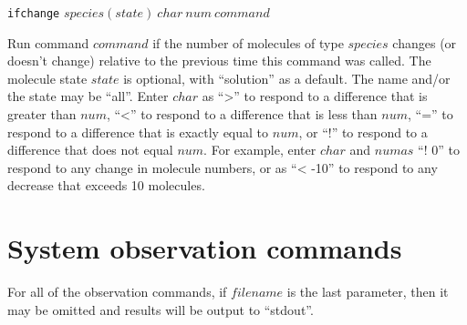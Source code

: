 \documentclass {scrbook}
\newcommand {\ttt} {\texttt}
\begin{document}
\begin{description}
\item{\ttt{ifchange} $species(state)\ char\ num\ command$}

Run command $command$ if the number of molecules of type $species$ changes (or doesn't change) relative to the previous time this command was called. The molecule state $state$ is optional, with ``solution'' as a default. The name and/or the state may be ``all''. Enter $char$ as ``>'' to respond to a difference that is greater than $num$, ``<'' to respond to a difference that is less than $num$, ``='' to respond to a difference that is exactly equal to $num$, or ``!'' to respond to a difference that does not equal $num$. For example, enter $char$ and $num as$ ``! 0'' to respond to any change in molecule numbers, or as ``< -10'' to respond to any decrease that exceeds 10 molecules.

\end{description}

\section{System observation commands}

For all of the observation commands, if $filename$ is the last parameter, then it may be omitted and results will be output to ``stdout''.
\end{document}
